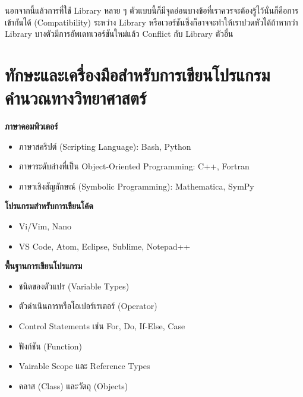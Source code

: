 นอกจากนี้แล้วการที่ใช้ Library หลาย ๆ ตัวแบบนี้ก็มีจุดอ่อนบางข้อที่เราควรจะต้องรู้ไว้นั่นก็คือการเข้ากันได้ (Compatibility) ระหว่าง Library
หรือเวอร์ชันซึ่งก็อาจจะทำให้เราปวดหัวได้ถ้าหากว่า Library บางตัวมีการอัพเดทเวอร์ชันใหม่แล้ว Conflict กับ Library ตัวอื่น

\section{ทักษะและเครื่องมือสำหรับการเขียนโปรแกรมคำนวณทางวิทยาศาสตร์}

\noindent \textbf{ภาษาคอมพิวเตอร์}

\begin{itemize}[topsep=0pt]
  \item ภาษาสคริปต์ (Scripting Language): Bash, Python

  \item ภาษาระดับล่างที่เป็น Object-Oriented Programming: C++, Fortran

  \item ภาษาเชิงสัญลักษณ์ (Symbolic Programming): Mathematica, SymPy
\end{itemize}

\noindent \textbf{โปรแกรมสำหรับการเขียนโค้ด}

\begin{itemize}[topsep=0pt]
  \item Vi/Vim, Nano

  \item VS Code, Atom, Eclipse, Sublime, Notepad++
\end{itemize}

\noindent \textbf{พื้นฐานการเขียนโปรแกรม}

\begin{itemize}[topsep=0pt]
  \item ชนิดของตัวแปร (Variable Types)

  \item ตัวดำเนินการหรือโอเปอร์เรเตอร์ (Operator)

  \item Control Statements เช่น For, Do, If-Else, Case

  \item ฟังก์ชัน (Function)

  \item Vairable Scope และ Reference Types

  \item คลาส (Class) และวัตถุ (Objects)
\end{itemize}

